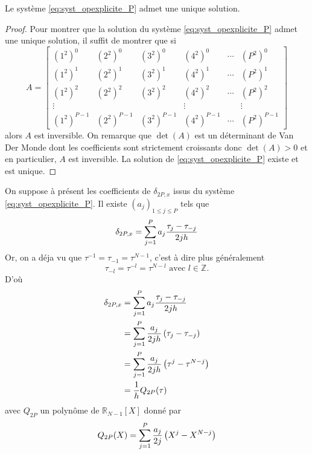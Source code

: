 \begin{proposition}
Le système \eqref{eq:syst_opexplicite_P} admet une unique solution.
\end{proposition}

\begin{proof}
Pour montrer que la solution du système \eqref{eq:syst_opexplicite_P} admet une unique solution, il suffit de montrer que si 
\begin{equation}
A = \begin{bmatrix}
(1^2)^0 & (2^2)^0 & (3^2)^0 & (4^2)^0 & \cdots & (P^2)^0\\
(1^2)^1 & (2^2)^1 & (3^2)^1 & (4^2)^1 & \cdots & (P^2)^1\\
(1^2)^2 & (2^2)^2 & (3^2)^2 & (4^2)^2 & \cdots & (P^2)^2\\
\vdots  &         &         & \vdots  &        &  \vdots\\
(1^2)^{P-1} & (2^2)^{P-1} & (3^2)^{P-1} & (4^2)^{P-1} & \cdots & (P^2)^{P-1}
\end{bmatrix} 
\end{equation}
alors $A$ est inversible.
On remarque que $\det (A)$ est un déterminant de Van Der Monde dont les coefficients sont strictement croissants donc $\det(A) > 0$ et en particulier, $A$ est inversible. La solution de \eqref{eq:syst_opexplicite_P} existe et est unique.
\end{proof}

On suppose à présent les coefficients de $\delta_{2P,x}$ issus du système \ref{eq:syst_opexplicite_P}. Il existe $(a_j)_{1 \leq j \leq P}$ tels que 
\begin{equation}
\delta_{2P,x} = \displaystyle\sum\limits_{j=1}^P a_j \dfrac{\tau_j - \tau_{-j}}{2jh}
\end{equation}
Or, on a déja vu que $\tau^{-1} = \tau_{-1} = \tau^{N-1}$, c'est à dire plus généralement
\begin{equation}
\tau_{-l} = \tau^{-l} = \tau^{N-l} \text{ avec } l \in \mathbb{Z}.
\end{equation}
D'où
\begin{align*}
\delta_{2P,x} & = \displaystyle\sum\limits_{j=1}^P a_j \dfrac{\tau_j - \tau_{-j}}{2jh}\\
	& = \displaystyle\sum\limits_{j=1}^P \dfrac{a_j}{2jh} \left( \tau_j - \tau_{-j} \right)\\
	& = \displaystyle\sum\limits_{j=1}^P \dfrac{a_j}{2jh} \left( \tau^j - \tau^{N-j} \right)\\
	& = \dfrac{1}{h} Q_{2P}(\tau)
\end{align*}
avec $Q_{2P}$ un polynôme de $\mathbb{R}_{N-1}[X]$ donné par
\begin{equation}
Q_{2P}(X) = \displaystyle\sum\limits_{j=1}^P \dfrac{a_j}{2j} \left( X^j - X^{N-j} \right)
\end{equation}

